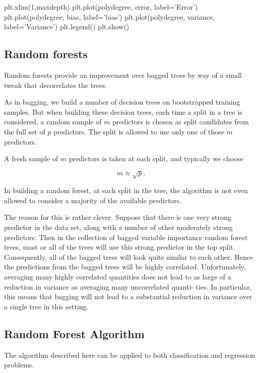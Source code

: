 \documentclass[%
oneside,                 %
final,                   %
10pt]{article}
\begin{document}
plt.xlim(1,maxdepth)
plt.plot(polydegree, error, label='Error')
plt.plot(polydegree, bias, label='bias')
plt.plot(polydegree, variance, label='Variance')
plt.legend()
plt.show()




\epycod




\subsection{Random forests}

Random forests provide an improvement over bagged trees by way of a
small tweak that decorrelates the trees. 

As in bagging, we build a
number of decision trees on bootstrapped training samples. But when
building these decision trees, each time a split in a tree is
considered, a random sample of $m$ predictors is chosen as split
candidates from the full set of $p$ predictors. The split is allowed to
use only one of those $m$ predictors. 

A fresh sample of $m$ predictors is
taken at each split, and typically we choose 

\[
m\approx \sqrt{p}.
\]

In building a random forest, at
each split in the tree, the algorithm is not even allowed to consider
a majority of the available predictors. 

The reason for this is rather clever. Suppose that there is one very
strong predictor in the data set, along with a number of other
moderately strong predictors. Then in the collection of bagged
variable importance random forest trees, most or all of the trees will
use this strong predictor in the top split. Consequently, all of the
bagged trees will look quite similar to each other. Hence the
predictions from the bagged trees will be highly correlated.
Unfortunately, averaging many highly correlated quantities does not
lead to as large of a reduction in variance as averaging many
uncorrelated quanti- ties. In particular, this means that bagging will
not lead to a substantial reduction in variance over a single tree in
this setting.


\subsection{Random Forest Algorithm}
The algorithm described here can be applied to both classification and regression problems.
\end{document}
